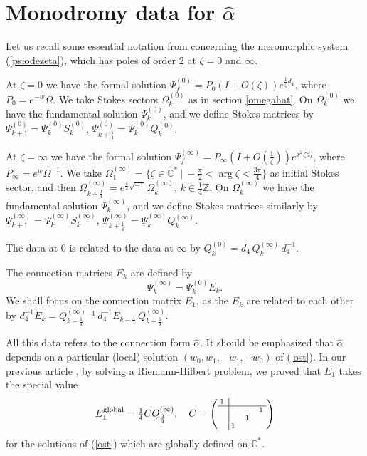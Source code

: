 \documentclass[a4paper,12pt,leqno]{amsart}
\numberwithin{equation}{section}
\theoremstyle{plain}
\theoremstyle{definition}
\newcommand{\C}{\mathbb C}
\newcommand{\Z}{\mathbb Z}
\newcommand{\al}{\alpha}
\newcommand{\Om}{\Omega}
\newcommand{\ze}{\zeta}
\DeclareMathOperator{\argu}{arg}
\newcommand{\st}{\ \vert\ }
\renewcommand{\i}{ {\scriptscriptstyle\sqrt{-1}}\, }
\newcommand{\Psiz}{  \Psi^{(0)}  }
\newcommand{\Psii}{  \Psi^{(\infty)}  }
\newcommand{\Sz}{  S^{(0)}  }
\newcommand{\Si}{  S^{(\infty)}  }
\newcommand{\Qz}{  Q^{(0)}  }
\newcommand{\Qi}{  Q^{(\infty)}  }
\newcommand{\Omz}{  \Om^{(0)}  }
\newcommand{\Omi}{  \Om^{(\infty)}  }
\begin{document}
\section{Monodromy data for $\hat\al$}\label{dkandek}

Let us recall some essential notation from \cite{GuItLi15} concerning the meromorphic system (\ref{psiodezeta}), which has poles of order $2$ at
$\ze=0$ and $\infty$.  

At $\ze=0$ we have the formal solution $\Psiz_f=P_0(I+O(\ze))e^{\frac1\ze d_4}$,  where $P_0=e^{-w}\Om$.  We take Stokes sectors $\Omz_k$ as in section \ref{omegahat}.  On $\Omz_k$ we have the fundamental solution 
$\Psiz_k$, and we define Stokes matrices by
$\Psiz_{k+1}=\Psiz_k\Sz_k$, $\Psiz_{k+\frac14}=\Psiz_k\Qz_k$.

At $\ze=\infty$ we have the formal solution $\Psii_f=P_\infty(I+O(\tfrac1\ze))e^{x^2\ze d_4}$,  where $P_\infty=e^w\Om^{-1}$. 
We take 
$
\Omi_1=\{ \ze\in\C^\ast \st -\tfrac\pi2 <\argu\ze < \tfrac{3\pi}4 \}
$
as initial Stokes sector, and then $\Omi_{k+\frac14}=e^{\frac\pi4\i}\Omi_k$, $k\in\tfrac14\Z$.  On $\Omi_k$ we have the fundamental solution 
$\Psii_k$, and we define Stokes matrices similarly by
$\Psii_{k+1}=\Psii_k\Si_k$, $\Psii_{k+\frac14}=\Psii_k\Qi_k$.

The data at $0$ is related to the data at $\infty$ by
$\Qz_k=d_4 \, \Qi_k\, d_4^{-1}$.

The connection matrices $E_k$ are defined by
\[
\Psii_k=\Psiz_k E_k.
\]
We shall focus on the connection matrix $E_1$, as the $E_k$ are related to each other by
$
d_4^{-1} E_k = \Qi_{k-\frac14} {}^{-1} \, d_4^{-1} E_{k-\frac14} \, \Qi_{k-\frac14}
$.

All this data refers to the connection form $\hat\al$.  It should be emphasized that $\hat\al$ depends on a particular (local) solution $(w_0,w_1,-w_1,-w_0)$ of (\ref{ost}). 
In our previous article \cite{GuItLi15}, by solving a Riemann-Hilbert problem,  we proved that $E_1$ takes the special value
\begin{equation}\label{globalE1}
E_1^{\text{global}} = \tfrac14C \Qi_{\frac34},
\quad 
{\scriptsize
C=
\left(
\begin{array}{c|ccc}
\!\!1 & & & \\
\hline
 & & & 1\!\\
 & & 1 & \\
 & \!\!1 & &
\end{array}
\right)
}
\end{equation}
for the solutions of (\ref{ost}) which are globally defined on $\C^\ast$. 
 
\end{document}
